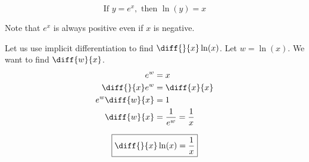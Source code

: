 $$
\boxed{\text{If } y = e^x, \text{ then } \ln(y) = x} 
$$

Note that $e^x$ is always positive even if $x$ is negative.

Let us use implicit differentiation to find $\diff{}{x} \ln(x)$. Let $w = \ln(x)$. We want to find $\diff{w}{x}$.
\begin{equation*}
\begin{split}
	e^w & = x \\
	\diff{}{x} e^w & = \diff{x}{x} \\
	e^w \diff{w}{x} & = 1 \\
	\diff{w}{x} & = \frac{1}{e^w} = \frac{1}{x} \\
\end{split}
\end{equation*}

$$
\boxed{\diff{}{x} \ln(x) = \frac{1}{x}} 
$$

